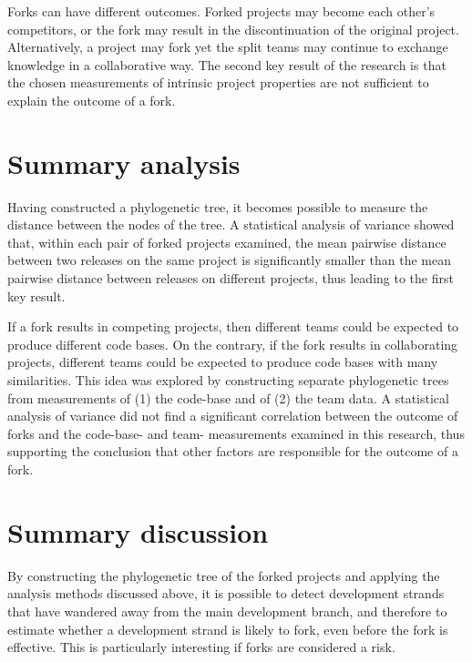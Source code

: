 Forks can have different outcomes. Forked projects may become each other's competitors, or the fork may result in the discontinuation of the original project. Alternatively, a project may fork yet the split teams may continue to exchange knowledge in a collaborative way. The second key result of the research is that the chosen measurements of intrinsic project properties are not sufficient to explain the outcome of a fork.


\section*{Summary analysis}

Having constructed a phylogenetic tree, it becomes possible to measure the distance between the nodes of the tree. A statistical analysis of variance showed that, within each pair of forked projects examined, the mean pairwise distance between two releases on the same project is significantly smaller than the mean pairwise distance between releases on different projects, thus leading to the first key result.

If a fork results in competing projects, then different teams could be expected to produce different code bases. On the contrary, if the fork results in collaborating projects, different teams could be expected to produce code bases with many similarities. This idea was explored by constructing separate phylogenetic trees from measurements of (1) the code-base and of (2) the team data. A statistical analysis of variance did not find a significant correlation between the outcome of forks and the code-base- and team- measurements examined in this research, thus supporting the conclusion that other factors are responsible for the outcome of a fork.


\section*{Summary discussion}

By constructing the phylogenetic tree of the forked projects and applying the analysis methods discussed above, it is possible to detect development strands that have wandered away from the main development branch, and therefore to estimate whether a development strand is likely to fork, even before the fork is effective. This is particularly interesting if forks are considered a risk.

